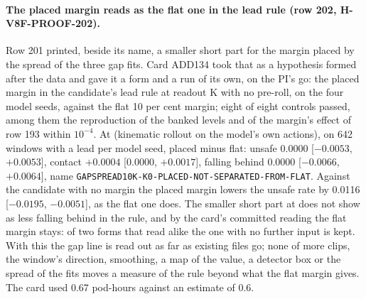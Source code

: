 \paragraph{The placed margin reads as the flat one in the lead rule (row 202, H-V8F-PROOF-202).} Row 201 printed, beside its name, a smaller short part for the margin placed by the spread of the three gap fits. Card ADD134 took that as a hypothesis formed after the data and gave it a form and a run of its own, on the PI's go: the placed margin in the candidate's lead rule at readout K with no pre-roll, on the four model seeds, against the flat 10 per cent margin; eight of eight controls passed, among them the reproduction of the banked levels and of the margin's effect of row 193 within $10^{-4}$. At  (kinematic rollout on the model's own actions), on 642 windows with a lead per model seed, placed minus flat: unsafe 0.0000 [$-0.0053$, $+0.0053$], contact $+0.0004$ [0.0000, $+0.0017$], falling behind 0.0000 [$-0.0066$, $+0.0064$], name \texttt{GAPSPREAD10K-K0-PLACED-\allowbreak NOT-SEPARATED-FROM-FLAT}. Against the candidate with no margin the placed margin lowers the unsafe rate by 0.0116 [$-0.0195$, $-0.0051$], as the flat one does. The smaller short part at  does not show as less falling behind in the rule, and by the card's committed reading the flat margin stays: of two forms that read alike the one with no further input is kept. With this the gap line is read out as far as existing files go; none of more clips, the window's direction, smoothing, a map of the value, a detector box or the spread of the fits moves a measure of the rule beyond what the flat margin gives. The card used 0.67 pod-hours against an estimate of 0.6.

